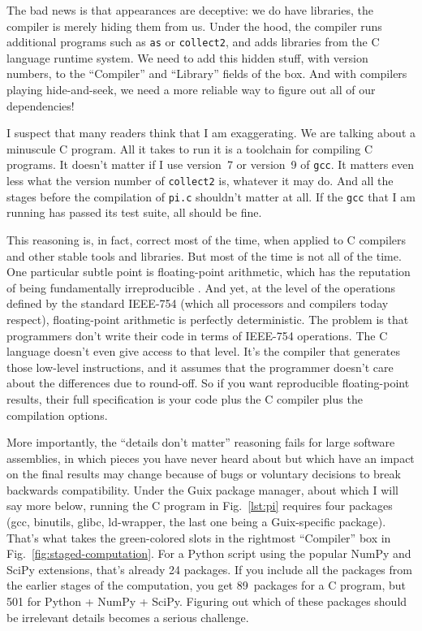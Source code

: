 \documentclass[10pt,journal,compsoc]{IEEEtran}
\begin{document}
The bad news is that appearances are deceptive: we do have libraries, the compiler is merely hiding them from us. Under the hood, the compiler runs additional programs such as \texttt{as} or \texttt{collect2}, and adds libraries from the C language runtime system. We need to add this hidden stuff, with version numbers, to the ``Compiler'' and ``Library'' fields of the box. And with compilers playing hide-and-seek, we need a more reliable way to figure out all of our dependencies!

I suspect that many readers think that I am exaggerating. We are talking about a minuscule C program. All it takes to run it is a toolchain for compiling C programs. It doesn't matter if I use version~7 or version~9 of \texttt{gcc}. It matters even less what the version number of \texttt{collect2} is, whatever it may do. And all the stages before the compilation of \texttt{pi.c} shouldn't matter at all. If the \texttt{gcc} that I am running has passed its test suite, all should be fine.

This reasoning is, in fact, correct most of the time, when applied to C compilers and other stable tools and libraries. But most of the time is not all of the time. One particular subtle point is floating-point arithmetic, which has the reputation of being fundamentally irreproducible \cite{approximation-tower}. And yet, at the level of the operations defined by the standard IEEE-754 (which all processors and compilers today respect), floating-point arithmetic is perfectly deterministic. The problem is that programmers don't write their code in terms of IEEE-754 operations. The C language doesn't even give access to that level. It's the compiler that generates those low-level instructions, and it assumes that the programmer doesn't care about the differences due to round-off. So if you want reproducible floating-point results, their full specification is your code plus the C compiler plus the compilation options.

More importantly, the ``details don't matter'' reasoning fails for large software assemblies, in which pieces you have never heard about but which have an impact on the final results may change because of bugs or voluntary decisions to break backwards compatibility. Under the Guix package manager, about which I will say more below, running the C program in Fig.~\ref{lst:pi} requires four packages (gcc, binutils, glibc, ld-wrapper, the last one being a Guix-specific package). That's what takes the green-colored slots in the rightmost ``Compiler'' box in Fig.~\ref{fig:staged-computation}. For a Python script using the popular NumPy and SciPy extensions, that's already 24 packages. If you include all the packages from the earlier stages of the computation, you get 89~packages for a C program, but 501 for Python + NumPy + SciPy. Figuring out which of these packages should be irrelevant details becomes a serious challenge.
\end{document}
